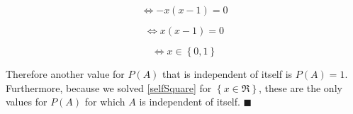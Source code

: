 \documentclass[a4paper,11pt]{article}
\begin{document}
\begin{equation}
  \iff -x\left(x - 1 \right) = 0
\end{equation}

\begin{equation}
  \iff x\left(x - 1 \right) = 0
\end{equation}

\begin{equation}
  \iff x \in \left\{0,1 \right\}
\end{equation}

Therefore another value for $P\left(A\right)$ that is independent of
itself is $P\left(A\right) = 1$.  Furthermore, because we solved
\ref{selfSquare} for $\left\{x \in \Re \right\}$, these are the only
values for $P\left( A \right)$ for which $A$ is independent of itself.
$\blacksquare$

\printbibliography{}
\end{document}
